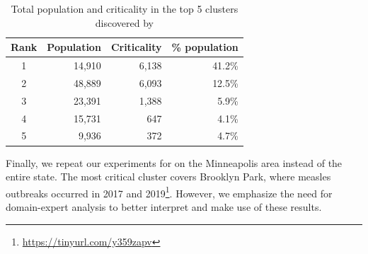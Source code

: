 \begin{table}
\centering
\caption{Total population and criticality in the top 5 clusters discovered by \algomaxcrit{}
}
\label{tab:top5-scores}
\vspace*{-.15in}
\begin{tabular}{|c|r|r|r|}
\hline
\textbf{Rank} & \textbf{Population} & \textbf{Criticality} & \textbf{\% population}\\
\hline
1 & 14,910 & 6,138 & 41.2\%\\
2 & 48,889 & 6,093 & 12.5\%\\
3 & 23,391 & 1,388 & 5.9\%\\
4 & 15,731 &   647 & 4.1\%\\
5 &  9,936 &   372 & 4.7\%\\
\hline
\end{tabular}
\end{table}

Finally, we repeat our experiments for \maxcrit{} on the Minneapolis area instead of the entire state. The most critical cluster covers Brooklyn Park, where measles outbreaks occurred in 2017 and 2019\footnote{\url{https://tinyurl.com/y359zapv}}. However, we emphasize the need for domain-expert analysis to better interpret and make use of these results.





